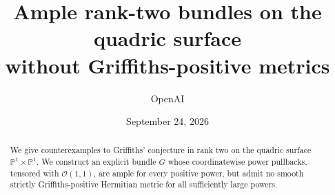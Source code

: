 \documentclass[11pt]{article}
\title{Ample rank-two bundles on the quadric surface\\
without Griffiths-positive metrics}
\author{OpenAI}
\date{September 24, 2026}
\newcommand{\PP}{\mathbb P}
\newcommand{\OO}{\mathcal O}
\theoremstyle{definition}
\theoremstyle{remark}
\numberwithin{equation}{section}
\begin{document}
\maketitle
\begin{abstract}
We give counterexamples to Griffiths' conjecture in rank two on the quadric
surface $\PP^1\times\PP^1$. We construct an explicit bundle $G$ whose
coordinatewise power pullbacks, tensored with $\OO(1,1)$, are ample for every
positive power, but admit no smooth strictly Griffiths-positive Hermitian
metric for all sufficiently large powers.
\end{abstract}
\tableofcontents






\begingroup
\small
\setlength{\emergencystretch}{1em}


\endgroup
\end{document}
